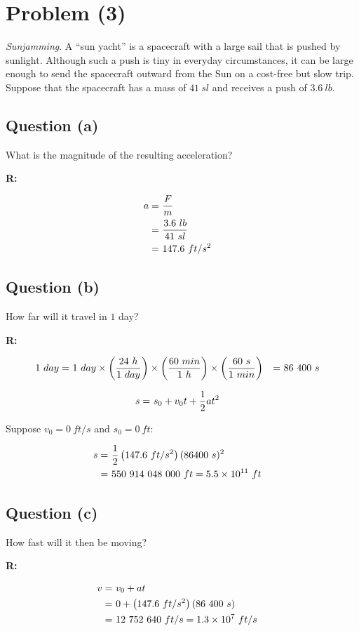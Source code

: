 \section{Problem (3)}
	\emph{Sunjamming}. A ``sun yacht'' is a spacecraft with a large sail that is pushed by sunlight. Although such a push is tiny in everyday circumstances, it can be large enough to send the spacecraft outward from the Sun on a cost-free but slow trip. Suppose that the spacecraft has a mass of $41 \ sl$ and receives a push of $3.6 \ lb$.

	\subsection{Question (a)}

		What is the magnitude of the resulting acceleration?

		\textbf{R:} \newline

		\begin{align}
			a = \ &\frac{F}{m}& \notag \\
			= \ &\frac{3.6 \ lb}{41 \ sl}& \notag \\
			= \ &147.6 \ ft/s^{2}&
		\end{align}

	\subsection{Question (b)}

		How far will it travel in $1$ day?

		\textbf{R:} \newline

		\begin{align}
			1 \ day = \ &1 \ day
			\times \left( \frac{24 \ h}{1 \ day} \right)
			\times \left( \frac{60 \ min}{1 \ h} \right)
			\times \left( \frac{60 \ s}{1 \ min} \right)& \notag
			= \ &86 \ 400 \ s&
		\end{align}

		\begin{align}
			s = \ &s_{0} + v_{0}t + \frac{1}{2}at^{2}& \notag
		\end{align}

		Suppose $v_{0} = 0 \ ft/s$ and $s_{0} = 0 \ ft$:

		\begin{align}
			s = \ &\frac{1}{2}\left( 147.6 \ ft/s^{2} \right) (86400 \ s)^{2}& \notag \\
			= \ &550 \ 914 \ 048 \ 000 \ ft = 5.5 \times 10^{11} \ ft&
		\end{align}

	\subsection{Question (c)}

		How fast will it then be moving?

		\textbf{R:} \newline

		\begin{align}
			v = \ &v_{0} + at& \notag \\
			= \ &0 + \left(147.6 \ ft/s^{2}\right)(86 \ 400 \ s)& \notag \\
			= \ &12 \ 752 \ 640 \ ft/s = 1.3 \times 10^{7} \ ft/s&
		\end{align}
